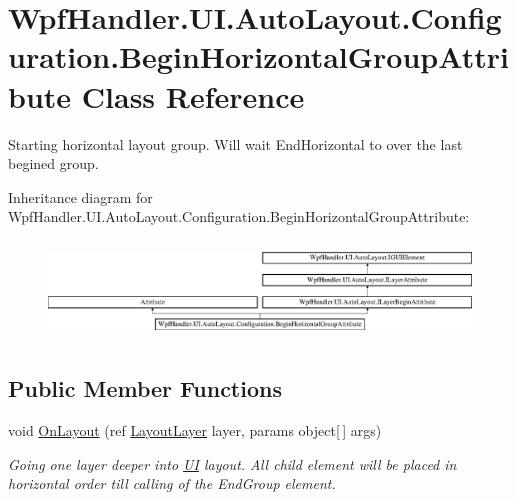 \hypertarget{class_wpf_handler_1_1_u_i_1_1_auto_layout_1_1_configuration_1_1_begin_horizontal_group_attribute}{}\section{Wpf\+Handler.\+U\+I.\+Auto\+Layout.\+Configuration.\+Begin\+Horizontal\+Group\+Attribute Class Reference}
\label{class_wpf_handler_1_1_u_i_1_1_auto_layout_1_1_configuration_1_1_begin_horizontal_group_attribute}


Starting horizontal layout group. Will wait End\+Horizontal to over the last begined group.  


Inheritance diagram for Wpf\+Handler.\+U\+I.\+Auto\+Layout.\+Configuration.\+Begin\+Horizontal\+Group\+Attribute\+:\begin{figure}[H]
\begin{center}
\leavevmode
\includegraphics[height=2.635294cm]{db/d6f/class_wpf_handler_1_1_u_i_1_1_auto_layout_1_1_configuration_1_1_begin_horizontal_group_attribute}
\end{center}
\end{figure}
\subsection*{Public Member Functions}
\begin{DoxyCompactItemize}
\item 
void \mbox{\hyperlink{class_wpf_handler_1_1_u_i_1_1_auto_layout_1_1_configuration_1_1_begin_horizontal_group_attribute_a8bb61f969389bece86c87fbfa44d4c82}{On\+Layout}} (ref \mbox{\hyperlink{class_wpf_handler_1_1_u_i_1_1_auto_layout_1_1_layout_layer}{Layout\+Layer}} layer, params object\mbox{[}$\,$\mbox{]} args)
\begin{DoxyCompactList}\small\item\em Going one layer deeper into \mbox{\hyperlink{namespace_wpf_handler_1_1_u_i}{UI}} layout. All child element will be placed in horizontal order till calling of the End\+Group element. \end{DoxyCompactList}\end{DoxyCompactItemize}
